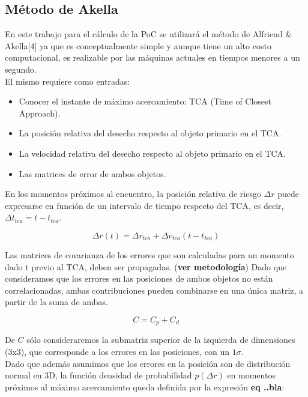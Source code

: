 \subsection*{M\'etodo de Akella}
En este trabajo para el c\'alculo de la PoC se utilizar\'a el m\'etodo de Alfriend \& Akella[4] ya que es conceptualmente simple y aunque tiene un alto costo computacional, es realizable por las m\'aquinas actuales en tiempos menores a un segundo.\\

El mismo requiere como entradas:
\begin{itemize}
 \item Conocer el instante de m\'aximo acercamiento: TCA (Time of Closest Approach).
 \item La posici\'on relativa del desecho respecto al objeto primario en el TCA.
 \item La velocidad relativa del desecho respecto al objeto primario en el TCA.
 \item Las matrices de error de ambos objetos.
\end{itemize}

En los momentos pr\'oximos al encuentro, la posici\'on relativa de riesgo $\Delta r$ puede expresarse en funci\'on de un intervalo de tiempo respecto del TCA, es decir, $\Delta t_{tca}=t-t_{tca}$.

\begin{equation}
 \Delta r(t)=\Delta r_{tca}+\Delta v_{tca}(t-t_{tca})
\end{equation}

Las matrices de covarianza de los errores que son calculadas para un momento dado t previo al TCA, deben ser propagadas. ({\bf{ver metodolog\'ia}})
Dado que consideramos que los errores en las posiciones de ambos objetos no est\'an correlacionadas, ambas contribuciones pueden combinarse en una \'unica matriz, a partir de la suma de ambas.

\begin{equation}
 C=C_{p}+C_{d}
\end{equation}

De $C$ s\'olo consideraremos la submatriz superior de la izquierda de dimensiones (3x3), que corresponde a los errores en las posiciones, con un $1 \sigma$.\\
Dado que adem\'as asumimos que los errores en la posici\'on son de distribuci\'on normal en 3D, la funci\'on densidad de probabilidad $p(\Delta r)$ en momentos pr\'oximos al m\'aximo acercamiento queda definida por la expresi\'on {\bf{eq ..bla}}:

